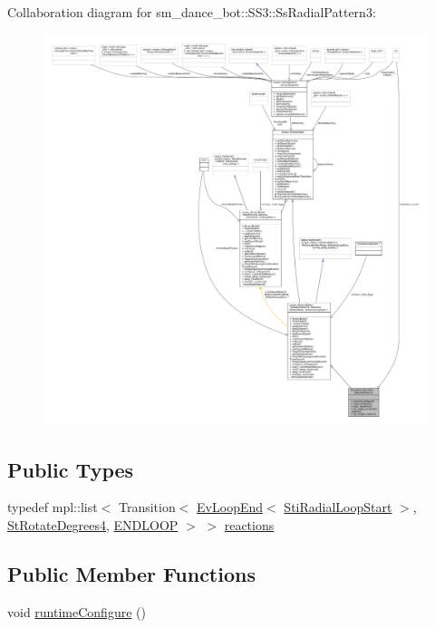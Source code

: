 Collaboration diagram for sm\+\_\+dance\+\_\+bot\+:\+:S\+S3\+:\+:Ss\+Radial\+Pattern3\+:
\nopagebreak
\begin{figure}[H]
\begin{center}
\leavevmode
\includegraphics[width=350pt]{structsm__dance__bot_1_1SS3_1_1SsRadialPattern3__coll__graph}
\end{center}
\end{figure}
\subsection*{Public Types}
\begin{DoxyCompactItemize}
\item 
typedef mpl\+::list$<$ Transition$<$ \hyperlink{structsmacc_1_1default__events_1_1EvLoopEnd}{Ev\+Loop\+End}$<$ \hyperlink{structsm__dance__bot_1_1radial__motion__states_1_1StiRadialLoopStart}{Sti\+Radial\+Loop\+Start} $>$, \hyperlink{structsm__dance__bot_1_1StRotateDegrees4}{St\+Rotate\+Degrees4}, \hyperlink{structsmacc_1_1default__transition__tags_1_1ENDLOOP}{E\+N\+D\+L\+O\+OP} $>$ $>$ \hyperlink{structsm__dance__bot_1_1SS3_1_1SsRadialPattern3_aa427cf1c1d77bc04e23acf4fb4bef9f1}{reactions}
\end{DoxyCompactItemize}
\subsection*{Public Member Functions}
\begin{DoxyCompactItemize}
\item 
void \hyperlink{structsm__dance__bot_1_1SS3_1_1SsRadialPattern3_aa470f8f74c73af4e98a4c151b3a19f97}{runtime\+Configure} ()
\end{DoxyCompactItemize}
